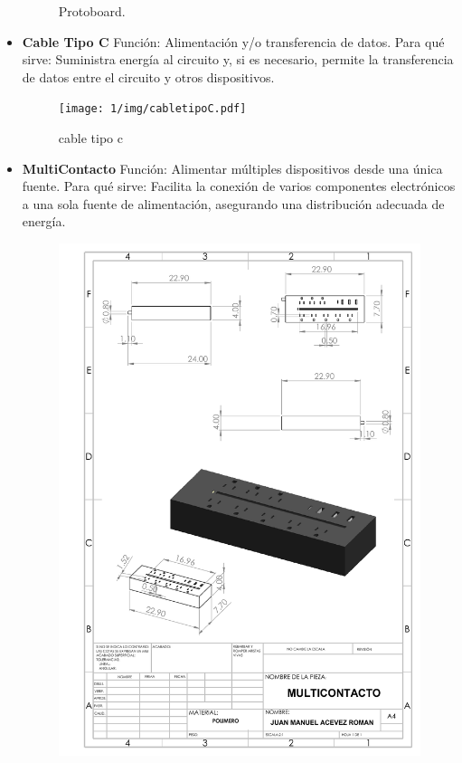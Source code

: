 \begin{itemize}
\begin{figure}[H]
        \caption{Protoboard.}
    \end{figure}
    \item \textbf{Cable Tipo C}
    Función: Alimentación y/o transferencia de datos.
    Para qué sirve: Suministra energía al circuito y, si es necesario, permite la transferencia de datos entre el circuito y otros dispositivos.
    \begin{figure}[H]
        \centering
        \texttt{[image: 1/img/cabletipoC.pdf]}
        \caption{cable tipo c}
    \end{figure}
    \item \textbf{MultiContacto}
    Función: Alimentar múltiples dispositivos desde una única fuente.
    Para qué sirve: Facilita la conexión de varios componentes electrónicos a una sola fuente de alimentación, asegurando una distribución adecuada de energía.
    \begin{figure}[H]
        \centering
        \includegraphics[scale=0.30]{1/img/multicontacto.pdf}

\end{figure}
\end{itemize}
